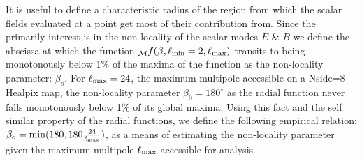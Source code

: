 
It is useful to define a characteristic radius of the region from which the scalar fields evaluated at a point get most of their contribution from.  Since the primarily interest is in the non-locality of the scalar modes $E$ \& $B$ we define the abscissa at which the function ${_{\mathcal{M}}f}(\beta,\ell_{\rm min}=2,\ell_{\rm max})$ transits to being monotonously below 1\% of the maxima of the function as the non-locality parameter: $\beta_{o}$.  For $\ell_{\rm max}=24$, the maximum multipole accessible on a Nside=8 Healpix map, the non-locality parameter $\beta_0=180^{\circ}$ as the radial function never falls monotonously below 1\% of its global maxima. Using this fact and the self similar property of the radial functions, we define the following empirical relation: $\beta_o= {\rm min}(180,180 \frac{24}{\ell_{\rm max}})$, as a means of estimating the non-locality parameter given the maximum multipole $\ell_{\rm max}$ accessible for analysis.